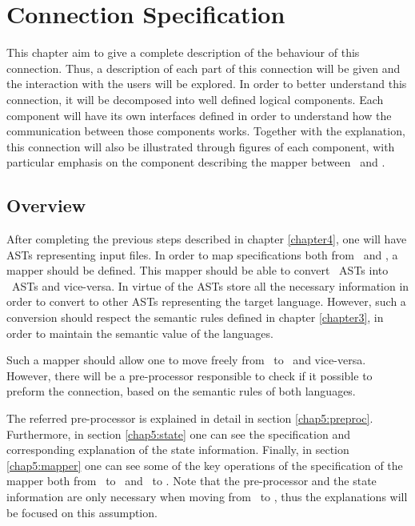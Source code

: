 \chapter{Connection Specification}
\label{chapter5}

This chapter aim to give a complete description of the behaviour of this connection. Thus, a description of each part of this connection will be given and the interaction with the users will be explored. In order to better understand this connection, it will be decomposed into well defined logical components. Each component will have its own interfaces defined in order to understand how the communication between those components works. Together with the explanation, this connection will also be illustrated through figures of each component, with particular emphasis on the component describing the mapper between \vpp\ and \jml.

\section{Overview}

After completing the previous steps described in chapter \ref{chapter4}, one will have ASTs representing input files. In order to map specifications both from \vpp\ and \jml, a mapper should be defined. This mapper should be able to convert \vpp\ ASTs into \jml\ ASTs and vice-versa. In virtue of the ASTs store all the necessary information in order to convert to other ASTs representing the target language. However, such a conversion should respect the semantic rules defined in chapter \ref{chapter3}, in order to maintain the semantic value of the languages.

Such a mapper should allow one to move freely from \vpp\ to \jml\ and vice-versa. However, there will be a pre-processor responsible to check if it possible to preform the connection, based on the semantic rules of both languages.

The referred pre-processor is explained in detail in section \ref{chap5:preproc}. Furthermore, in section \ref{chap5:state} one can see the specification and corresponding explanation of the state information. Finally, in section \ref{chap5:mapper} one can see some of the key operations of the specification of the mapper both from \vpp\ to \jml\ and \jml\ to \vpp. Note that the pre-processor and the state information are only necessary when moving from \vpp\ to \jml, thus the explanations will be focused on this assumption.


